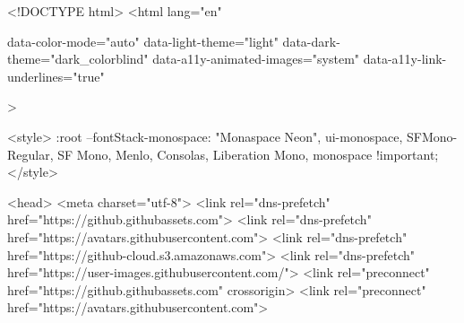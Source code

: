 





<!DOCTYPE html>
<html
  lang="en"
  
  data-color-mode="auto" data-light-theme="light" data-dark-theme="dark_colorblind"
  data-a11y-animated-images="system" data-a11y-link-underlines="true"
  
  >

    <style>
:root {
  --fontStack-monospace: "Monaspace Neon", ui-monospace, SFMono-Regular, SF Mono, Menlo, Consolas, Liberation Mono, monospace !important;
}
</style>




  <head>
    <meta charset="utf-8">
  <link rel="dns-prefetch" href="https://github.githubassets.com">
  <link rel="dns-prefetch" href="https://avatars.githubusercontent.com">
  <link rel="dns-prefetch" href="https://github-cloud.s3.amazonaws.com">
  <link rel="dns-prefetch" href="https://user-images.githubusercontent.com/">
  <link rel="preconnect" href="https://github.githubassets.com" crossorigin>
  <link rel="preconnect" href="https://avatars.githubusercontent.com">

  


